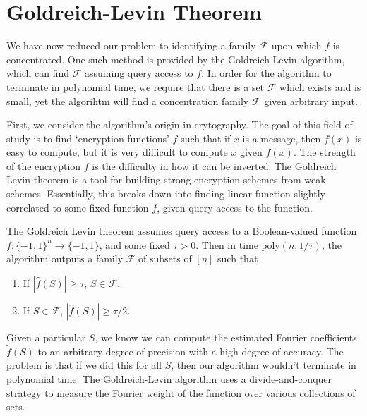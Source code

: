 \section{Goldreich-Levin Theorem}

We have now reduced our problem to identifying a family $\mathcal{F}$ upon which $f$ is concentrated. One such method is provided by the Goldreich-Levin algorithm, which can find $\mathcal{F}$ assuming query access to $f$. In order for the algorithm to terminate in polynomial time, we require that there is a set $\mathcal{F}$ which exists and is small, yet the algorihtm will find a concentration family $\mathcal{F}$ given arbitrary input.

First, we consider the algorithm's origin in crytography. The goal of this field of study is to find `encryption functions' $f$ such that if $x$ is a message, then $f(x)$ is easy to compute, but it is very difficult to compute $x$ given $f(x)$. The strength of the encryption $f$ is the difficulty in how it can be inverted. The Goldreich Levin theorem is a tool for building strong encryption schemes from weak schemes. Essentially, this breaks down into finding linear function slightly correlated to some fixed function $f$, given query access to the function.

The Goldreich Levin theorem assumes query access to a Boolean-valued function $f: \{ -1, 1 \}^n \to \{ -1, 1 \}$, and some fixed $\tau > 0$. Then in time $\text{poly}(n,1/\tau)$, the algorithm outputs a family $\mathcal{F}$ of subsets of $[n]$ such that
%
\begin{enumerate}
        \item If $|\widehat{f}(S)| \geq \tau$, $S \in \mathcal{F}$.
        \item If $S \in \mathcal{F}$, $|\widehat{f}(S)| \geq \tau/2$.
\end{enumerate}
%
Given a particular $S$, we know we can compute the estimated Fourier coefficients $\tilde{f}(S)$ to an arbitrary degree of precision with a high degree of accuracy. The problem is that if we did this for all $S$, then our algorithm wouldn't terminate in polynomial time. The Goldreich-Levin algorithm uses a divide-and-conquer strategy to measure the Fourier weight of the function over various collections of sets.


